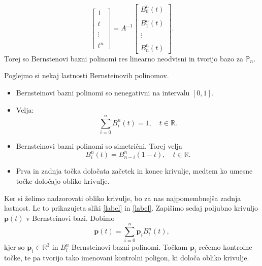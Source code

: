 \documentclass[mat1]{fmfdelo}
\newcommand{\R}{\mathbb R}
\newcommand{\pp}{\boldsymbol p}
\newcommand{\B}{\mathcal B}
\begin{document}
\begin{dokaz}
\begin{equation*}
\begin{bmatrix}
		1 \\   \\  t \\ \\ \vdots \\ \\ t^n
		\end{bmatrix}
		= A^{-1}
		\begin{bmatrix}
		B_0^n(t) \\ \\B_1^n(t) \\ \\ \vdots \\ \\ B_n^n(t)
		\end{bmatrix}.		
	\end{equation*}
	Torej so Bernstenovi bazni polinomi res linearno neodvisni in tvorijo bazo za $\mathbb{P}_n$.
\end{dokaz}
Poglejmo si nekaj lastnosti Bernsteinovih polinomov.
\begin{itemize}
	\item Bernsteinovi bazni polinomi so nenegativni na intervalu $\left[0,1\right]$.
	\item Velja:
	\begin{equation*}
		\sum_{i=0}^n B_i^n(t) = 1, \quad t\in \R.
	\end{equation*}
	\item Bernsteinovi bazni polinomi so simetrični. Torej velja
	\begin{equation*}
		B_i^n(t) = B_{n-i}^n(1-t), \quad t\in\R.
	\end{equation*}
	\item Prva in zadnja točka določata začetek in konec krivulje, medtem ko umesne točke določajo obliko krivulje.
\end{itemize}
Ker si želimo nadzorovati obliko krivulje, bo za nas najpomembnejša zadnja lastnost. Le to prikazujeta sliki \ref{label} in \ref{label}.
Zapišimo sedaj poljubno krivuljo $\pp(t)$ v Bernsteinovi bazi. Dobimo
\begin{equation*}
\pp(t) = \sum_{i=0}^n \pp_i B_i^n(t),
\end{equation*}
kjer so $\pp_i \in \R^3$ in $B_i^n$ Bernsteinovi bazni polinomi. Točkam $\pp_i$ rečemo kontrolne točke, te pa tvorijo tako imenovani kontrolni poligon, ki določa obliko krivulje.
\end{document}
